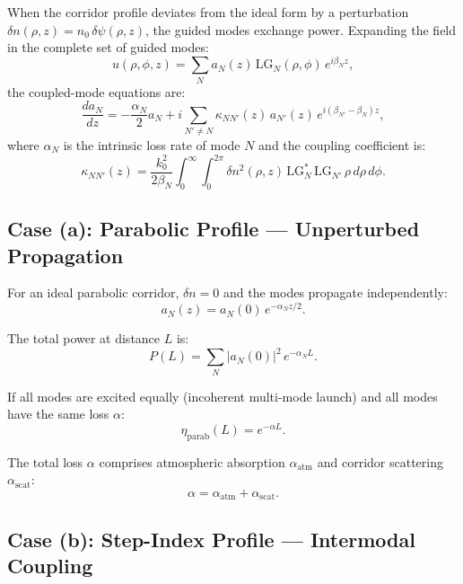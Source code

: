 \documentclass[journal,twocolumn]{IEEEtran}
\newcommand{\LG}{\mathrm{LG}}
\begin{document}
When the corridor profile deviates from the ideal form by a perturbation
$\delta n(\rho,z) = n_0\,\delta\psi(\rho,z)$, the guided modes
exchange power. Expanding the field in the complete set of guided modes:
\begin{equation}
u(\rho,\phi,z) = \sum_N a_N(z)\,\LG_N(\rho,\phi)\,e^{i\beta_N z},
\label{eq:mode_expansion}
\end{equation}
the coupled-mode equations are:
\begin{equation}
\frac{da_N}{dz} = -\frac{\alpha_N}{2}a_N
+ i\sum_{N' \neq N} \kappa_{NN'}(z)\,a_{N'}(z)\,
e^{i(\beta_{N'} - \beta_N)z},
\label{eq:coupled_mode}
\end{equation}
where $\alpha_N$ is the intrinsic loss rate of mode $N$ and the
coupling coefficient is:
\begin{equation}
\kappa_{NN'}(z) = \frac{k_0^2}{2\beta_N}
\int_0^\infty \int_0^{2\pi}
\delta n^2(\rho,z)\,\LG_N^*\,\LG_{N'}\,\rho\,d\rho\,d\phi.
\label{eq:coupling_coeff}
\end{equation}

\subsection{Case (a): Parabolic Profile --- Unperturbed Propagation}

For an ideal parabolic corridor, $\delta n = 0$ and the modes propagate
independently:
\begin{equation}
a_N(z) = a_N(0)\,e^{-\alpha_N z/2}.
\label{eq:parabolic_prop}
\end{equation}

The total power at distance $L$ is:
\begin{equation}
P(L) = \sum_N |a_N(0)|^2\,e^{-\alpha_N L}.
\label{eq:power_parabolic}
\end{equation}

If all modes are excited equally (incoherent multi-mode launch) and all
modes have the same loss $\alpha$:
\begin{equation}
\eta_\text{parab}(L) = e^{-\alpha L}.
\label{eq:eff_parabolic}
\end{equation}

The total loss $\alpha$ comprises atmospheric absorption $\alpha_\text{atm}$
and corridor scattering $\alpha_\text{scat}$:
\begin{equation}
\alpha = \alpha_\text{atm} + \alpha_\text{scat}.
\end{equation}

\subsection{Case (b): Step-Index Profile --- Intermodal Coupling}
\end{document}
